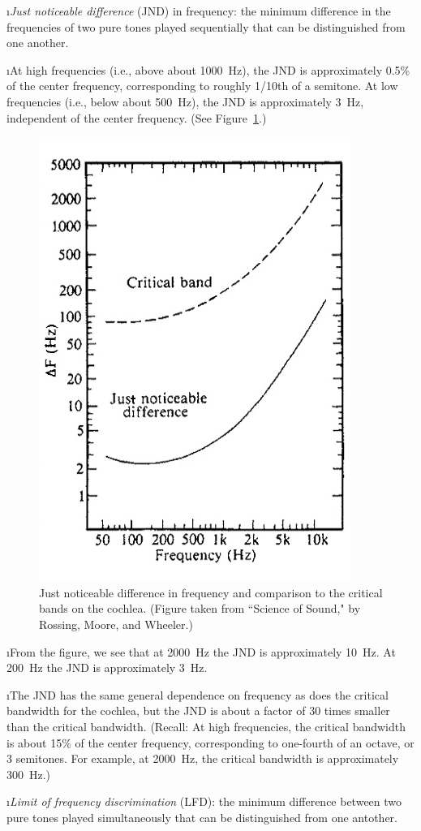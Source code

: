 \i {\em Just noticeable difference} (JND) in frequency:
the minimum difference in the frequencies of 
two pure tones played sequentially that can
be distinguished from one another.

\i At high frequencies (i.e., above about 1000~Hz), the 
JND is approximately 0.5\% of the center frequency,
corresponding to roughly 1/10th of a semitone.
At low frequencies (i.e., below about 500~Hz), the 
JND is approximately 3~Hz, independent of the center frequency.
(See Figure~\ref{f:jnd_pitch}.)

\begin{figure}[htbp]
\begin{center}
\includegraphics[width=.4\textwidth]{freqJNDa.jpg}
\caption{Just noticeable difference in frequency
and comparison to the critical bands on the cochlea.
(Figure taken from ``Science of Sound," by Rossing, Moore, and Wheeler.)}
\label{f:jnd_pitch}
\end{center}
\end{figure}
%

\i \ex From the figure, we see that at 2000~Hz 
the JND is approximately 10~Hz.
At 200~Hz the JND is approximately 3~Hz.

\i The JND has the same general dependence on 
frequency as does the critical bandwidth 
for the cochlea, but the JND is about a factor 
of 30 times smaller than the critical bandwidth.
(Recall: At high frequencies, 
the critical bandwidth is about 
15\% of the center frequency, corresponding
to one-fourth of an octave, or 3 semitones.
For example, at 2000~Hz, the critical bandwidth
is approximately 300~Hz.)

\i {\em Limit of frequency discrimination} (LFD):
the minimum difference between two pure tones 
played simultaneously that can be distinguished
from one antother.

